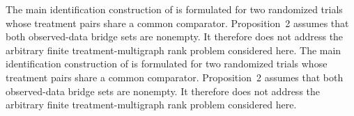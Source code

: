 The main identification construction of \cite{SuRytgaardRavnEriksson2026} is formulated for two randomized trials whose treatment pairs share a common comparator.  Proposition~2 assumes that both observed-data bridge sets are nonempty.  It therefore does not address the arbitrary finite treatment-multigraph rank problem considered here.
The main identification construction of \cite{SuRytgaardRavnEriksson2026} is formulated for two randomized trials whose treatment pairs share a common comparator.  Proposition~2 assumes that both observed-data bridge sets are nonempty.  It therefore does not address the arbitrary finite treatment-multigraph rank problem considered here.
